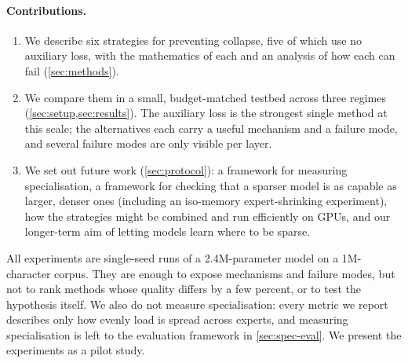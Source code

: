\documentclass[10pt]{article}
\theoremstyle{definition}
\theoremstyle{remark}
\begin{document}
\paragraph{Contributions.}
\begin{enumerate}
  \item We describe six strategies for preventing collapse, five of which use no auxiliary loss, with the mathematics of each and an analysis of how each can fail (\cref{sec:methods}).
  \item We compare them in a small, budget-matched testbed across three regimes (\cref{sec:setup,sec:results}). The auxiliary loss is the strongest single method at this scale; the alternatives each carry a useful mechanism and a failure mode, and several failure modes are only visible per layer.
  \item We set out future work (\cref{sec:protocol}): a framework for measuring specialisation, a framework for checking that a sparser model is as capable as larger, denser ones (including an iso-memory expert-shrinking experiment), how the strategies might be combined and run efficiently on GPUs, and our longer-term aim of letting models learn where to be sparse.
\end{enumerate}

All experiments are single-seed runs of a 2.4M-parameter model on a 1M-character corpus. They are enough to expose mechanisms and failure modes, but not to rank methods whose quality differs by a few percent, or to test the hypothesis itself. We also do not measure specialisation: every metric we report describes only how evenly load is spread across experts, and measuring specialisation is left to the evaluation framework in \cref{sec:spec-eval}. We present the experiments as a pilot study.

\end{document}
